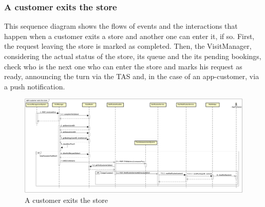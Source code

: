 \documentclass[a4paper,oneside,11pt]{book}
\begin{document}
    \subsubsection{A customer exits the store}
    This sequence diagram shows the flows of events and the interactions that happen when a customer exits a store and another one can enter it, if so. First, the request leaving the store is marked as completed. Then, the VisitManager, considering the actual status of the store, its queue and the its pending bookings, check who is the next one who can enter the store and marks his request as ready, announcing the turn via the TAS and, in the case of an app-customer, via a push notification.
    \begin{figure}[H]
        \centering
        \includegraphics[width=\textwidth, height=\textheight, keepaspectratio]{pictures/sequence_diagrams/a_customer_exits_the_store}
        \caption{A customer exits the store}
        \label{figure:a_customer_exits_the_store}
    \end{figure}
    \newpage
\end{document}
